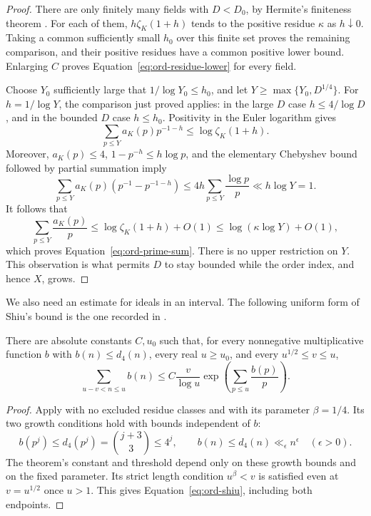 \begin{proof}
There are only finitely many fields with \(D<D_0\), by Hermite's
finiteness theorem \cite[Theorem~8.43]{MilneANT}.  For each of them,
\(h\zeta_K(1+h)\) tends to the positive residue \(\kappa\) as
\(h\downarrow0\).  Taking a common sufficiently small \(h_0\) over
this finite set proves the remaining comparison, and their positive
residues have a common positive lower bound.  Enlarging \(C\) proves
Equation~\eqref{eq:ord-residue-lower} for every field.

Choose \(Y_0\) sufficiently large that \(1/\log Y_0\le h_0\), and
let \(Y\ge\max\{Y_0,D^{1/4}\}\).  For \(h=1/\log Y\), the comparison
just proved applies: in the large \(D\) case \(h\le4/\log D\), and
in the bounded \(D\) case \(h\le h_0\).  Positivity in the Euler
logarithm gives
\[
 \sum_{p\le Y}a_K(p)p^{-1-h}\le\log\zeta_K(1+h).
\]
Moreover, \(a_K(p)\le4\), \(1-p^{-h}\le h\log p\), and the elementary
Chebyshev bound followed by partial summation imply
\[
 \sum_{p\le Y}a_K(p)(p^{-1}-p^{-1-h})
 \le4h\sum_{p\le Y}\frac{\log p}{p}
 \ll h\log Y=1.
\]
It follows that
\[
 \sum_{p\le Y}\frac{a_K(p)}p
 \le \log\zeta_K(1+h)+O(1)
 \le \log(\kappa\log Y)+O(1),
\]
which proves Equation~\eqref{eq:ord-prime-sum}.  There is no upper
restriction on \(Y\).  This observation is what permits \(D\) to stay
bounded while the order index, and hence \(X\), grows.
\end{proof}

We also need an estimate for ideals in an interval.  The following
uniform form of Shiu's bound \cite{Shiu1980} is the one recorded in
\cite[Equation~(4.2)]{PrimeDegreePackets}.

\begin{lemma}\label{lem:ord-shiu}
There are absolute constants \(C,u_0\) such that, for every
nonnegative multiplicative function \(b\) with \(b(n)\le d_4(n)\),
every real \(u\ge u_0\), and every \(u^{1/2}\le v\le u\),
\begin{equation}\label{eq:ord-shiu}
 \sum_{u-v<n\le u}b(n)
 \le C\frac v{\log u}
       \exp\left(\sum_{p\le u}\frac{b(p)}p\right).
\end{equation}
\end{lemma}

\begin{proof}
Apply \cite[Theorem~1.1]{Pollack2020} with no excluded residue classes
and with its parameter \(\beta=1/4\).  Its two growth conditions hold
with bounds independent of \(b\):
\[
 b(p^j)\le d_4(p^j)=\binom{j+3}{3}\le4^j,\qquad
 b(n)\le d_4(n)\ll_\epsilon n^\epsilon
 \quad(\epsilon>0).
\]
The theorem's constant and threshold depend only on these growth
bounds and on the fixed parameter.  Its strict length condition
\(u^\beta<v\) is satisfied even at \(v=u^{1/2}\) once \(u>1\).
This gives Equation~\eqref{eq:ord-shiu}, including both endpoints.
\end{proof}

